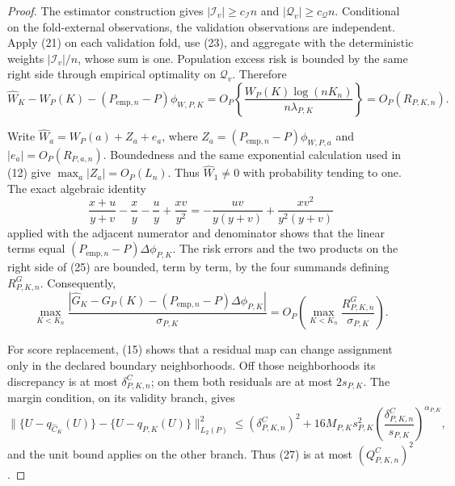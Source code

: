 \documentclass{article}
\begin{document}
\begin{proof}
The estimator construction gives \(|\mathcal I_v|\geq c_{\mathcal I}n\) and \(|\mathcal Q_v|\geq c_{\mathcal Q}n\).  Conditional on the fold-external observations, the validation observations are independent.  Apply (21) on each validation fold, use (23), and aggregate with the deterministic weights \(|\mathcal I_v|/n\), whose sum is one.  Population excess risk is bounded by the same right side through empirical optimality on \(\mathcal Q_v\).  Therefore
\[
 \widehat W_K-W_P(K)-(P_{\mathrm{emp},n}-P)\phi_{W,P,K}
 =O_P\!\left\{\frac{W_P(K)\log(nK_n)}{n\lambda_{P,K}}\right\}
 =O_P(R_{P,K,n}).                                                            \tag{24}
\]

Write \(\widehat W_a=W_P(a)+Z_a+e_a\), where \(Z_a=(P_{\mathrm{emp},n}-P)\phi_{W,P,a}\) and \(|e_a|=O_P(R_{P,a,n})\).  Boundedness and the same exponential calculation used in (12) give \(\max_a|Z_a|=O_P(L_n)\).  Thus \(\widehat W_1\neq0\) with probability tending to one.  The exact algebraic identity
\[
 \frac{x+u}{y+v}-\frac xy-\frac uy+\frac{xv}{y^2}
 =-\frac{uv}{y(y+v)}+\frac{xv^2}{y^2(y+v)}                                  \tag{25}
\]
applied with the adjacent numerator and denominator shows that the linear terms equal \((P_{\mathrm{emp},n}-P)\Delta\phi_{P,K}\).  The risk errors and the two products on the right side of (25) are bounded, term by term, by the four summands defining \(R^G_{P,K,n}\).  Consequently,
\[
 \max_{K<K_n}\frac{|\widehat G_K-G_P(K)
 -(P_{\mathrm{emp},n}-P)\Delta\phi_{P,K}|}{\sigma_{P,K}}
 =O_P\!\left(\max_{K<K_n}\frac{R^G_{P,K,n}}{\sigma_{P,K}}\right).          \tag{26}
\]

For score replacement, (15) shows that a residual map can change assignment only in the declared boundary neighborhoods.  Off those neighborhoods its discrepancy is at most \(\delta^C_{P,K,n}\); on them both residuals are at most \(2s_{P,K}\).  The margin condition, on its validity branch, gives
\[
 \|\{U-q_{\widehat C_K}(U)\}-\{U-q_{P,K}(U)\}\|_{L_2(P)}^2
 \leq(\delta^C_{P,K,n})^2
 +16M_{P,K}s_{P,K}^2
 \left(\frac{\delta^C_{P,K,n}}{s_{P,K}}\right)^{\alpha_{P,K}},             \tag{27}
\]
and the unit bound applies on the other branch.  Thus (27) is at most \((Q^C_{P,K,n})^2\).


\end{proof}
\end{document}
